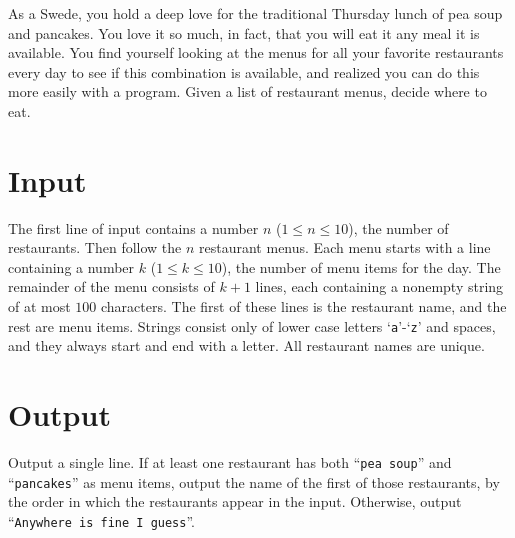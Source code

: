 
%
\noindent
As a Swede, you hold a deep love for the traditional Thursday lunch of pea soup and pancakes. You love it so much, in fact, that you will eat it any meal it is available. You find yourself looking at the menus for all your favorite restaurants every day to see if this combination is available, and realized you can do this more easily with a program. Given a list of restaurant menus, decide where to eat.

\section*{Input}

The first line of input contains a number $n$ ($1 \le n \le 10$), the number of restaurants. Then follow the $n$ restaurant menus.  Each menu starts with a line containing a number $k$ ($1 \le k \le 10$), the number of menu items for the day. The remainder of the menu consists of $k + 1$ lines, each containing a nonempty string of at most $100$ characters. The first of these lines is the restaurant name, and the rest are menu items. Strings consist only of lower case letters `\texttt{a}'-`\texttt{z}' and spaces, and they always start and end with a letter. All restaurant names are unique.

\section*{Output}

Output a single line. If at least one restaurant has both ``\texttt{pea soup}'' and ``\texttt{pancakes}'' as menu items, output the name of the first of those restaurants, by the order in which the restaurants appear in the input. Otherwise, output ``\texttt{Anywhere is fine I guess}''.
